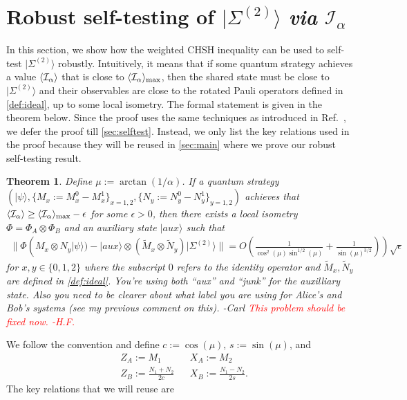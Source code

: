 \documentclass[11pt,letterpaper]{article}
\newcommand{\ket}[1]{|#1\rangle}
\newcommand{\x}{\otimes}
\DeclarePairedDelimiter{\ip}{\langle}{\rangle}
\newcommand{\1}{\mathbb{1}}
\newcommand{\EPR}[1]{\Sigma^{(#1)}}
\newcommand{\tM}{\tilde{M}}
\newcommand{\tN}{\tilde{N}}
\newcommand{\I}{\mathcal{I}}
\def\carl#1{{\color{blue} #1 -Carl}}
\newcommand{\hfc}[1]{\textcolor{red}{#1 -H.F.}}
\newtheorem{theorem}{Theorem}[section]
\theoremstyle{definition}
\begin{document}
\section{Robust self-testing of $\ket{\EPR{2}}$ \textit{via} $\I_\alpha$}
\label{sec:chsh}
In this section, we show how the weighted CHSH inequality can be used to self-test $\ket{\EPR{2}}$ robustly.
Intuitively, it means that if some quantum strategy achieves a value $\ip{\I_\alpha}$ that is close to $\ip{\I_\alpha}_{\max}$,
then the shared state must be close to $\ket{\EPR{2}}$ and their observables are close to the rotated Pauli operators 
defined in \cref{def:ideal},
up to some local isometry.
The formal statement is given in the theorem below. Since the proof uses the same techniques as introduced in Ref.~\cite{bamps2015},
we defer the proof till \cref{sec:selftest}. Instead, we only list the key relations used in the proof because they will be reused in 
\cref{sec:main} where we prove our robust self-testing result.
\begin{theorem}
\label{thm:selftest}
    Define $\mu := \arctan(1/\alpha)$.
	If a quantum strategy $(\ket{\psi}, \{M_x:=M_x^0-M_x^1\}_{x=1,2}, \{N_y :=N_y^0-N_y^1\}_{y = 1,2} )$ achieves that
	$\ip{\I_\alpha} \geq \ip{\I_\alpha}_{\max} - \epsilon$
	for some $\epsilon > 0$, then
	there exists a local isometry $\Phi = \Phi_A \x \Phi_B$ and an auxiliary state $\ket{aux}$  such that
	\begin{align*}
		\| \Phi( M_x \x N_y \ket{\psi}) -\ket{aux} \x (\tM_x \x \tN_y) \ket{\EPR{2}}  \| = O(\frac{1}{\cos^2(\mu)\sin^{1/2}(\mu)}+
		\frac{1}{\sin(\mu)^{3/2}})) \sqrt{\epsilon}
	\end{align*}
	for $x,y \in \{0, 1, 2\}$ where the subscript $0$ refers to the identity operator and $\tM_x, \tN_y$ are 
	defined in \cref{def:ideal}.  \carl{You're using both ``aux'' and ``junk'' for the auxilliary state.  Also you need
	to be clearer about what label you are using for Alice's and Bob's systems (see my previous comment on this).}
	\hfc{This problem should be fixed now.}
\end{theorem}
We follow the convention and define $c := \cos(\mu)$, $s := \sin(\mu)$, and
\begin{align*}
	&Z_A := M_1 && X_A := M_2\\
	&Z_B := \frac{N_1+N_2}{2c} && X_B := \frac{N_1-N_2}{2s}.
\end{align*}
The key relations that we will reuse are
\end{document}
